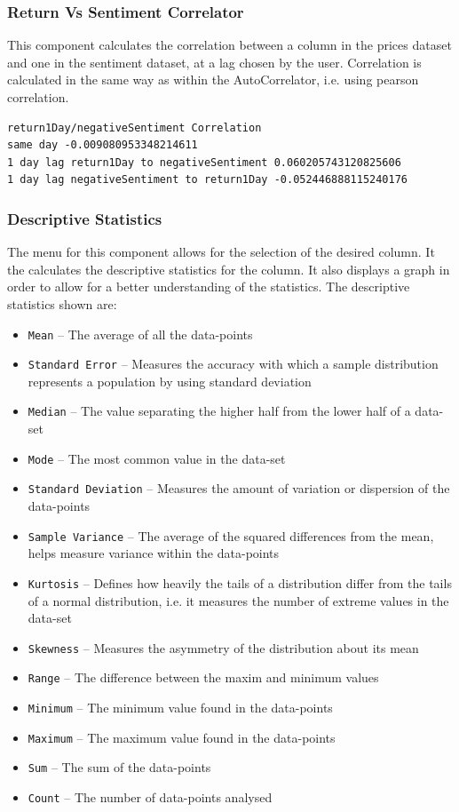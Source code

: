 \subsubsection{Return Vs Sentiment Correlator}

This component calculates the correlation between a column in the prices dataset and one in the sentiment dataset, at a lag chosen by the user. Correlation is calculated in the same way as within the AutoCorrelator, i.e. using pearson correlation.

\begin{lstlisting}[caption=Example Return Vs Sentiment Output]
return1Day/negativeSentiment Correlation
same day -0.009080953348214611
1 day lag return1Day to negativeSentiment 0.060205743120825606
1 day lag negativeSentiment to return1Day -0.052446888115240176
\end{lstlisting}

\subsubsection{Descriptive Statistics}

The menu for this component allows for the selection of the desired column. It the calculates the descriptive statistics for the column. It also displays a graph in order to allow for a better understanding of the statistics. The descriptive statistics shown are:
\begin{itemize}
    \item \texttt{Mean} -- The average of all the data-points
    \item \texttt{Standard Error} -- Measures the accuracy with which a sample distribution represents a population by using standard deviation
    \item \texttt{Median} -- The value separating the higher half from the lower half of a data-set
    \item \texttt{Mode} -- The most common value in the data-set
    \item \texttt{Standard Deviation} -- Measures the amount of variation or dispersion of the data-points
    \item \texttt{Sample Variance} -- The average of the squared differences from the mean, helps measure variance within the data-points
    \item \texttt{Kurtosis} -- Defines how heavily the tails of a distribution differ from the tails of a normal distribution, i.e. it measures the number of extreme values in the data-set
    \item \texttt{Skewness} -- Measures the asymmetry of the distribution about its mean
    \item \texttt{Range} -- The difference between the maxim and minimum values
    \item \texttt{Minimum} -- The minimum value found in the data-points
    \item \texttt{Maximum} -- The maximum value found in the data-points
    \item \texttt{Sum} -- The sum of the data-points
    \item \texttt{Count} -- The number of data-points analysed
\end{itemize}

